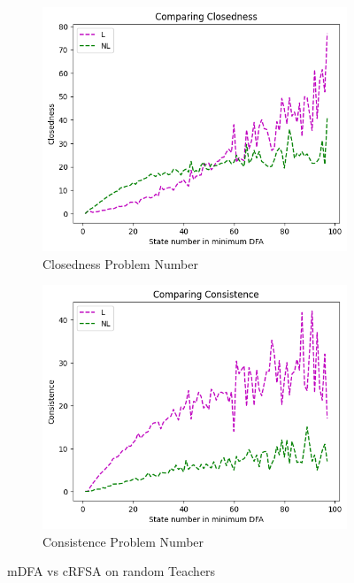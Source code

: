 \begin{figure}[!htb]
\begin{subfigure}[b]{0.3\textwidth}
  \end{subfigure}
  \begin{subfigure}[b]{0.3\textwidth}
    \includegraphics[width=\textwidth]{../statistics/plots/BenchMark/Closedness.png}
    \caption{Closedness Problem Number}
    \label{fig:ClosednessBenchMarkCompare}
  \end{subfigure}
  \begin{subfigure}[b]{0.3\textwidth}
    \includegraphics[width=\textwidth]{../statistics/plots/BenchMark/Consistence.png}
    \caption{Consistence Problem Number}
    \label{fig:ConsistenceBenchMarkCompare}
  \end{subfigure}
  \caption{mDFA vs cRFSA on random Teachers}
  \label{fig:benchmark}
\end{figure}

